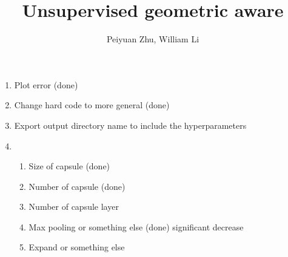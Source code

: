 \documentclass{article}
\author{Peiyuan Zhu, William Li}
\title{Unsupervised geometric aware}
\begin{document}
	\maketitle
	\begin{enumerate}
		\item Plot error (done)
		\item Change hard code to more general (done)
		\item Export output directory name to include the hyperparameters
		\item 
		\begin{enumerate}
			\item Size of capsule (done)
			\item Number of capsule (done)
			\item Number of capsule layer
			\item Max pooling or something else (done) significant decrease
			\item Expand or something else
		\end{enumerate}
	\end{enumerate}
\end{document}

